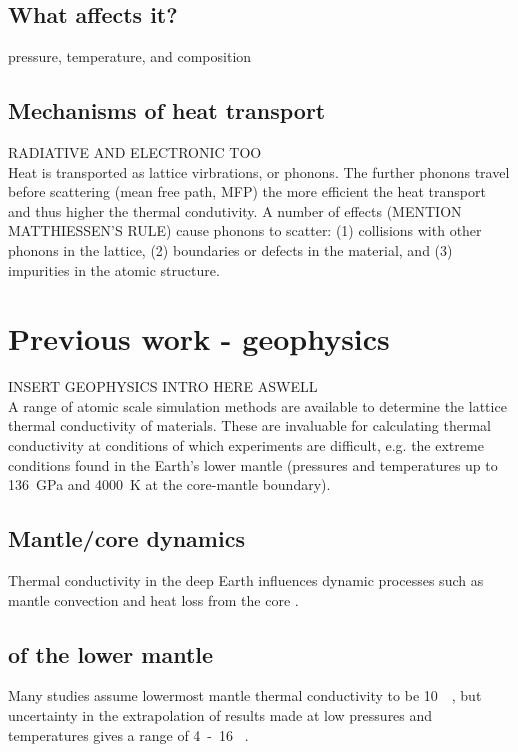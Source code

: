 \subsection{What affects it?}
pressure, temperature, and composition

\subsection{Mechanisms of heat transport}
RADIATIVE AND ELECTRONIC TOO\\

Heat is transported as lattice virbrations, or phonons. The further phonons travel before scattering (mean free path, MFP) the more efficient the heat transport and thus higher the thermal condutivity. A number of effects (MENTION MATTHIESSEN'S RULE) cause phonons to scatter: (1) collisions with other phonons in the lattice, (2) boundaries or defects in the material, and (3) impurities in the atomic structure. 



\section{Previous work - geophysics}
INSERT GEOPHYSICS INTRO HERE ASWELL\\

A range of atomic scale simulation methods are available to determine the lattice thermal conductivity of materials. These are invaluable for calculating thermal conductivity at conditions of which experiments are difficult, e.g. the extreme conditions found in the Earth's lower mantle (pressures and temperatures up to 136~GPa and 4000~K at the core-mantle boundary). 

\subsection{Mantle/core dynamics}
Thermal conductivity in the deep Earth influences dynamic processes such as mantle convection and heat loss from the core \citep{Lay2008}.

\subsection{\Tc of the lower mantle}
Many studies assume lowermost mantle thermal conductivity to be 10~\wmk~\citep[e.g.][]{Lay2008}, but uncertainty in the extrapolation of results made at low pressures and temperatures gives a range of 4~-~16 \wmk~\citep{Brown1986, Osako1991, Hofmeister1999, Goncharov2009, Manthilake2011, Ohta2012}.

